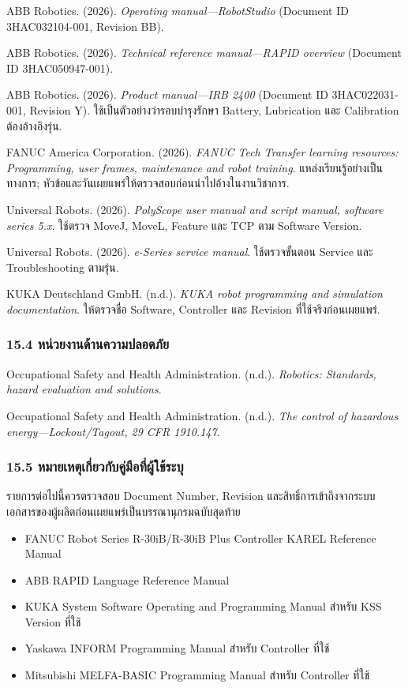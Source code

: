 ABB Robotics. (2026). \textit{Operating manual—RobotStudio} (Document ID 3HAC032104-001, Revision BB).

ABB Robotics. (2026). \textit{Technical reference manual—RAPID overview} (Document ID 3HAC050947-001).

ABB Robotics. (2026). \textit{Product manual—IRB 2400} (Document ID 3HAC022031-001, Revision Y). ใช้เป็นตัวอย่างว่ารอบบำรุงรักษา Battery, Lubrication และ Calibration ต้องอ้างอิงรุ่น.

FANUC America Corporation. (2026). \textit{FANUC Tech Transfer learning resources: Programming, user frames, maintenance and robot training}. แหล่งเรียนรู้อย่างเป็นทางการ; หัวข้อและวันเผยแพร่ให้ตรวจสอบก่อนนำไปอ้างในงานวิชาการ.

Universal Robots. (2026). \textit{PolyScope user manual and script manual, software series 5.x}. ใช้ตรวจ MoveJ, MoveL, Feature และ TCP ตาม Software Version.

Universal Robots. (2026). \textit{e-Series service manual}. ใช้ตรวจขั้นตอน Service และ Troubleshooting ตามรุ่น.

KUKA Deutschland GmbH. (n.d.). \textit{KUKA robot programming and simulation documentation}. ให้ตรวจชื่อ Software, Controller และ Revision ที่ใช้จริงก่อนเผยแพร่.

\subsubsection{15.4 หน่วยงานด้านความปลอดภัย}

Occupational Safety and Health Administration. (n.d.). \textit{Robotics: Standards, hazard evaluation and solutions}.

Occupational Safety and Health Administration. (n.d.). \textit{The control of hazardous energy—Lockout/Tagout, 29 CFR 1910.147}.

\subsubsection{15.5 หมายเหตุเกี่ยวกับคู่มือที่ผู้ใช้ระบุ}

รายการต่อไปนี้ควรตรวจสอบ Document Number, Revision และสิทธิ์การเข้าถึงจากระบบเอกสารของผู้ผลิตก่อนเผยแพร่เป็นบรรณานุกรมฉบับสุดท้าย

\begin{itemize}
    \item FANUC Robot Series R-30iB/R-30iB Plus Controller KAREL Reference Manual
    \item ABB RAPID Language Reference Manual
    \item KUKA System Software Operating and Programming Manual สำหรับ KSS Version ที่ใช้
    \item Yaskawa INFORM Programming Manual สำหรับ Controller ที่ใช้
    \item Mitsubishi MELFA-BASIC Programming Manual สำหรับ Controller ที่ใช้
\end{itemize}



